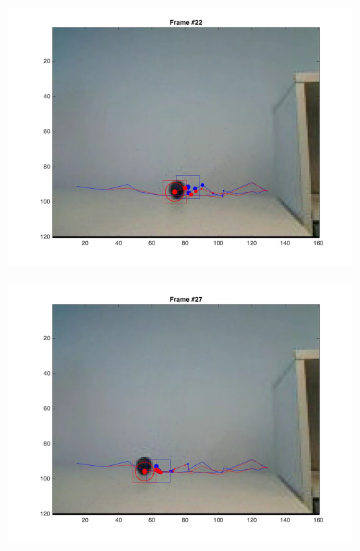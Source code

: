 \documentclass{ethz_report}
\begin{document}
\begin{figure}[h]
\begin{subfigure}[b]{.25\textwidth}
        \includegraphics[width=1\linewidth]{images/video3_particles_low_21}
    \end{subfigure}%
    \begin{subfigure}[b]{.25\textwidth}
        \centering
        \includegraphics[width=1\linewidth]{images/video3_particles_low_26}
    \end{subfigure}%
    \begin{subfigure}[b]{.25\textwidth}
        \centering

\end{subfigure}
\end{figure}
\end{document}
